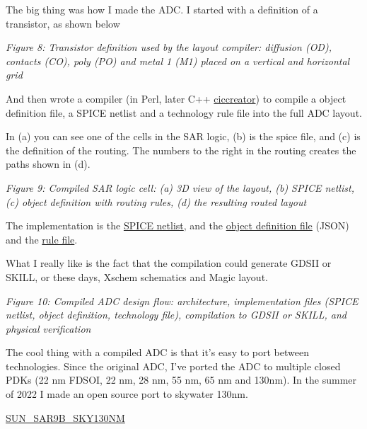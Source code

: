 The big thing was how I made the ADC. I started with a definition of a
transistor, as shown below


{
\centering
{}
}

\emph{Figure 8: Transistor definition used by the layout compiler:
diffusion (OD), contacts (CO), poly (PO) and metal 1 (M1) placed on a
vertical and horizontal grid}

And then wrote a compiler (in Perl, later C++
\href{https://github.com/wulffern/ciccreator}{ciccreator}) to compile a
object definition file, a SPICE netlist and a technology rule file into
the full ADC layout.

In (a) you can see one of the cells in the SAR logic, (b) is the spice
file, and (c) is the definition of the routing. The numbers to the right
in the routing creates the paths shown in (d).


{
\centering
{}
}

\emph{Figure 9: Compiled SAR logic cell: (a) 3D view of the layout, (b)
SPICE netlist, (c) object definition with routing rules, (d) the
resulting routed layout}

The implementation is the
\href{https://github.com/wulffern/sun_sar9b_sky130nm/blob/main/cic/ip.spi}{SPICE
netlist}, and the
\href{https://github.com/wulffern/sun_sar9b_sky130nm/blob/main/cic/ip.json}{object
definition file} (JSON) and the
\href{https://github.com/wulffern/sun_sar9b_sky130nm/blob/main/cic/sky130.tech}{rule
file}.

What I really like is the fact that the compilation could generate GDSII
or SKILL, or these days, Xschem schematics and Magic layout.


{
\centering
{}
}

\emph{Figure 10: Compiled ADC design flow: architecture, implementation
files (SPICE netlist, object definition, technology file), compilation
to GDSII or SKILL, and physical verification}

The cool thing with a compiled ADC is that it's easy to port between
technologies. Since the original ADC, I've ported the ADC to multiple
closed PDKs (22 nm FDSOI, 22 nm, 28 nm, 55 nm, 65 nm and 130nm). In the
summer of 2022 I made an open source port to skywater 130nm.

\href{https://github.com/wulffern/sun_sar9b_sky130nm/}{SUN\_SAR9B\_SKY130NM}


{
\centering
{}
}

